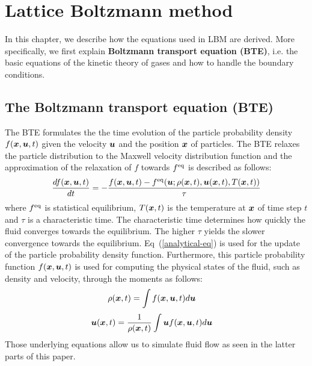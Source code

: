 \chapter{Lattice Boltzmann method}
\vspace{-5mm}
In this chapter, we describe how the equations used in LBM
are derived.
More specifically, we first explain
{\bf Boltzmann transport equation (BTE)}, i.e.
the basic equations of the kinetic theory of gases and
how to handle the boundary conditions.

\section{The Boltzmann transport equation (BTE)}
The BTE formulates the the time evolution of the 
particle probability density $f(\boldsymbol{x}, \boldsymbol{u}, t)$ given
the velocity $\boldsymbol{u}$ and the position $\boldsymbol{x}$ of particles.
The BTE relaxes the particle distribution to
the Maxwell velocity distribution
function\cite{} and the approximation of the relaxation of
$f$ towards $f^{\rm eq}$ is described as follows\cite{}:
\begin{equation}
  \begin{aligned}
    \frac{d f(\boldsymbol{x}, \boldsymbol{u}, t)}{d t} &= 
    - \frac{
      f(\boldsymbol{x}, \boldsymbol{u}, t) - f^{\rm eq}(\boldsymbol{u}; \rho(\boldsymbol{x}, t), \boldsymbol{u}(\boldsymbol{x}, t), T(\boldsymbol{x}, t))
      }{\tau} \\
    \end{aligned}
    \label{analytical-eq}
  \end{equation}
where $f^{\rm eq}$ is statistical equilibrium,
$T(\boldsymbol{x}, t)$ is the temperature at $\boldsymbol{x}$
of time step $t$ and
$\tau$ is a characteristic time\cite{}.
The characteristic time determines how quickly
the fluid converges towards the equilibrium.
The higher $\tau$ yields the slower 
convergence towards the equilibrium.
Eq~(\ref{analytical-eq}) is used for the update 
of the particle probability density function.
Furthermore, this particle probability function
$f(\boldsymbol{x}, \boldsymbol{u}, t)$ is used for computing
the physical states of the fluid,
such as density and velocity,
through the moments as follows:
\begin{equation}
  \begin{aligned}
    \rho(\boldsymbol{x}, t) &= \int f(\boldsymbol{x}, \boldsymbol{u}, t) d\boldsymbol{u} 
  \end{aligned}
  \label{density-analytical-update}
\end{equation}
\begin{equation}
\begin{aligned}
  \boldsymbol{u}(\boldsymbol{x}, t) &= \frac{1}{\rho(\boldsymbol{x}, t)} \int \boldsymbol{u} f(\boldsymbol{x}, \boldsymbol{u}, t)  d\boldsymbol{u}
\end{aligned}
\label{velocity-analytical-update}
\end{equation}
Those underlying equations allow us to simulate
fluid flow as seen in the latter parts of this paper.

